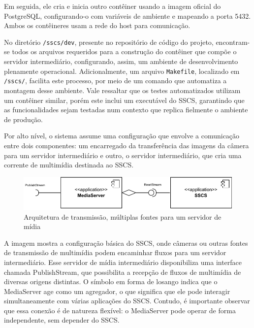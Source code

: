 \documentclass[12pt, %
openright, 
oneside, %
a4paper,    %
brazil]{facom-ufu-abntex2}
\begin{document}
Em seguida, ele cria e inicia outro contêiner usando a imagem oficial do
PostgreSQL, configurando-o com variáveis de ambiente e mapeando a porta 5432.
Ambos os contêineres usam a rede do host para comunicação.

No diretório \texttt{/sscs/dev}, presente no repositório de código do projeto,
encontram-se todos os arquivos requeridos para a construção do contêiner que
compõe o servidor intermediário, configurando, assim, um ambiente de
desenvolvimento plenamente operacional. Adicionalmente, um arquivo
\texttt{Makefile}, localizado em \texttt{/sscs/}, facilita este processo, por
meio de um comando que automatiza a montagem desse ambiente. Vale ressaltar que
os testes automatizados utilizam um contêiner similar, porém este inclui um
executável do SSCS, garantindo que as funcionalidades sejam testadas num
contexto que replica fielmente o ambiente de produção.

Por alto nível, o sistema assume uma configuração que envolve a comunicação
entre dois componentes: um encarregado da transferência das imagens da câmera
para um servidor intermediário e outro, o servidor intermediário, que cria uma
corrente de multimídia destinada ao SSCS.

\begin{figure}[!ht]
	\centering
	\includegraphics[width=1\linewidth]{arch1.pdf}
	\caption[Exemplo de arquitetura de transmissão]{Arquitetura de transmissão, múltiplas fontes para um servidor de mídia}
	\label{fig:graficosVariandoTamanhoRede}
\end{figure}


A imagem mostra a configuração básica do SSCS, onde câmeras ou outras fontes de
transmissão de multimídia podem encaminhar fluxos para um servidor
intermediário. Esse servidor de mídia intermediário disponibiliza uma interface
chamada PublishStream, que possibilita a recepção de fluxos de multimídia de
diversas origens distintas. O símbolo em forma de losango indica que o
MediaServer age como um agregador, o que significa que ele pode interagir
simultaneamente com várias aplicações do SSCS. Contudo, é importante observar
que essa conexão é de natureza flexível: o MediaServer pode operar de forma
independente, sem depender do SSCS.
\end{document}
